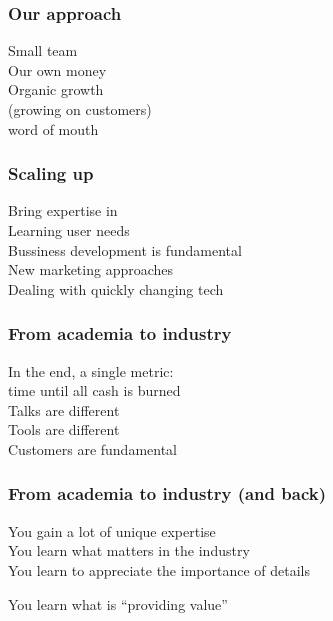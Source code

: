 \documentclass[17pt,aspectratio=169,hyperref=pdfusetitle]{beamer}
\begin{document}
\begin{frame}[fragile]
  \frametitle{Our approach}

  Small team \\
  Our own money \\
  Organic growth \\
  (growing on customers) \\
  word of mouth \\
  
\end{frame}

\begin{frame}[fragile]
  \frametitle{Scaling up}

  Bring expertise in \\
  Learning user needs \\
  Bussiness development is fundamental \\
  New marketing approaches \\
  Dealing with quickly changing tech \\
  
\end{frame}

\begin{frame}[fragile]
  \frametitle{From academia to industry}

  In the end, a single metric: \\
  time until all cash is burned \\
  \vspace{1cm}
  Talks are different \\
  Tools are different \\
  Customers are fundamental \\
\end{frame}

\begin{frame}[fragile]
  \frametitle{From academia to industry (and back)}

  You gain a lot of unique expertise \\
  You learn what matters in the industry \\
  You learn to appreciate the importance of details \\
  \vspace{1cm}
  \begin{flushright}
    You learn what is
    ``providing value''
  \end{flushright}
\end{frame}
\end{document}
